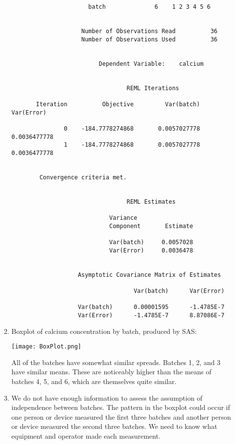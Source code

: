 \documentclass[11pt]{article}
\begin{document}
\begin{enumerate}
\begin{enumerate}
\begin{verbatim}
                      batch              6    1 2 3 4 5 6 


                    Number of Observations Read          36
                    Number of Observations Used          36


                         Dependent Variable:    calcium


                                 REML Iterations
 
       Iteration          Objective         Var(batch)         Var(Error)

               0    -184.7778274868       0.0057027778       0.0036477778
               1    -184.7778274868       0.0057027778       0.0036477778


        Convergence criteria met.                                       


                                 REML Estimates
 
                            Variance
                            Component       Estimate

                            Var(batch)     0.0057028
                            Var(Error)     0.0036478


                   Asymptotic Covariance Matrix of Estimates
 
                                   Var(batch)      Var(Error)

                   Var(batch)      0.00001595      -1.4785E-7
                   Var(Error)      -1.4785E-7      8.87086E-7
\end{verbatim}

\item %
Boxplot of calcium concentration by batch, produced by SAS:
\begin{center}
\texttt{[image: BoxPlot.png]}
\end{center}
All of the batches have somewhat similar spreads. Batches 1, 2, and 3 have similar
means. These are noticeably higher than the means of batches 4, 5, and 6,
which are themselves quite similar.

\item %
We do not have enough information to assess the assumption of independence
between batches. The pattern in the boxplot could occur if one person or
device measured the first three batches and another person or device measured
the second three batches. We need to know what equipment and operator made each
measurement.

\end{enumerate}


\end{enumerate}
\end{document}
